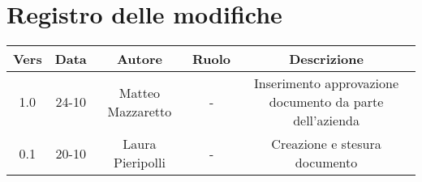 \section{Registro delle modifiche}

\begin{table}[htbp]
	\begin{tabular}{|c|c|c|c|c|}
		\hline
		\rowcolor[gray]{0.9}
		Vers & Data & Autore & Ruolo & Descrizione \\
		\hline
		1.0 & 24-10 & Matteo Mazzaretto & - & Inserimento approvazione documento da parte dell'azienda \\
		\hline
		0.1 & 20-10 & Laura Pieripolli & - & Creazione e stesura documento \\
		\hline
	\end{tabular}
\end{table}